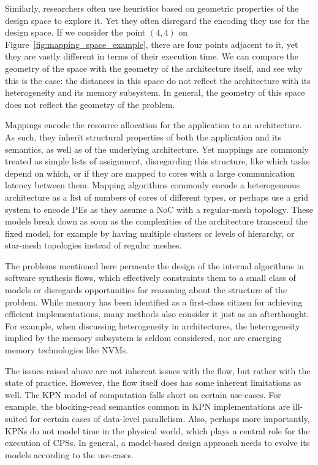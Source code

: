 Similarly, researchers often use heuristics based on geometric properties of the design space to explore it.
Yet they often disregard the encoding they use for the design space.
If we consider the point $(4,4)$ on Figure~\ref{fig:mapping_space_example}, there are four points adjacent to it, yet they are vastly different in terms of their execution time.
We can compare the geometry of the space with the geometry of the architecture itself, and see why this is the case: the distances in this space do not reflect the architecture with its heterogeneity and its memory subsystem.
In general, the geometry of this space does not reflect the geometry of the problem. 

Mappings encode the resource allocation for the application to an architecture.
As such, they inherit structural properties of both the application and its semantics, as well as of the underlying architecture.
Yet mappings are commonly treated as simple lists of assignment, disregarding this structure, like which tasks depend on which, or if they are mapped to cores with a large communication latency between them.
Mapping algorithms commonly encode a heterogeneous architecture as a list of numbers of cores of different types, or perhaps use a grid system to encode \acp{PE} as they assume a \ac{NoC} with a regular-mesh topology.
These models break down as soon as the complexities of the architecture transcend the fixed model, for example by having multiple clusters or levels of hierarchy, or star-mesh topologies instead of regular meshes.

The problems mentioned here permeate the design of the internal algorithms in software synthesis flows, which effectively constraints them to a small class of models or disregards opportunities for reasoning about the structure of the problem. 
While memory has been identified as a first-class citizen for achieving efficient implementations, many methods also consider it just as an afterthought.
For example, when discussing heterogeneity in architectures, the heterogeneity implied by the memory subsystem is seldom considered, nor are emerging memory technologies like \acp{NVM}.

The issues raised above are not inherent issues with the flow, but rather with the state of practice.
However, the flow itself does has some inherent limitations as well.
The \ac{KPN} model of computation falls short on certain use-cases.
For example, the blocking-read semantics common in \ac{KPN} implementations are ill-suited for certain cases of data-level parallelism.
Also, perhaps more importantly, \acp{KPN} do not model time in the physical world, which plays a central role for the execution of \acp{CPS}.
In general, a model-based design approach needs to evolve its models according to the use-cases.

